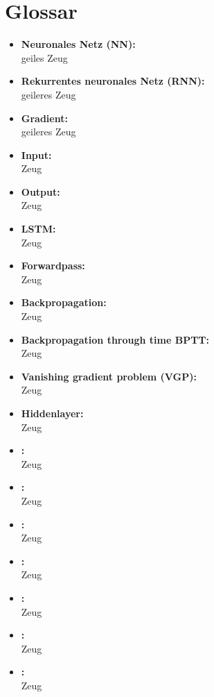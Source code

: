 \chapter{Glossar} 
\label{ch:glossar}
	\begin{itemize}
		\item \textbf{Neuronales Netz (NN):}\\
		geiles Zeug
		\item \textbf{Rekurrentes neuronales Netz (RNN):}\\
		geileres Zeug
		\item \textbf{Gradient:}\\
		geileres Zeug
		\item \textbf{Input:}\\
		Zeug
		\item \textbf{Output:}\\
		Zeug
		\item \textbf{LSTM:}\\
		Zeug
		\item \textbf{Forwardpass:}\\
		Zeug
		\item \textbf{Backpropagation:}\\
		Zeug
		\item \textbf{Backpropagation through time BPTT:}\\
		Zeug
		\item \textbf{Vanishing gradient problem (VGP):}\\
		Zeug
		\item \textbf{Hiddenlayer:}\\
		Zeug
		\item \textbf{:}\\
		Zeug
		\item \textbf{:}\\
		Zeug
		\item \textbf{:}\\
		Zeug
		\item \textbf{:}\\
		Zeug
		\item \textbf{:}\\
		Zeug
		\item \textbf{:}\\
		Zeug
		\item \textbf{:}\\
		Zeug
		
		
		
	
	\end{itemize}